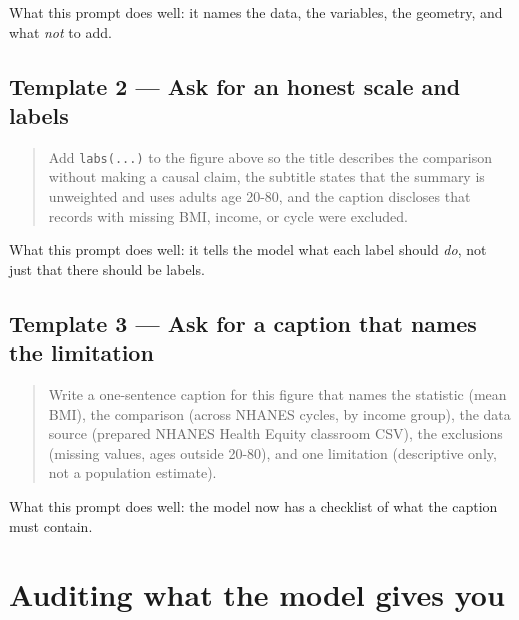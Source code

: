 \documentclass[
  letterpaper,
  DIV=11,
  numbers=noendperiod,
  oneside]{scrreprt}
\begin{document}
What this prompt does well: it names the data, the variables, the
geometry, and what \emph{not} to add.

\subsection*{Template 2 --- Ask for an honest scale and
labels}\label{template-2-ask-for-an-honest-scale-and-labels}

\begin{quote}
Add \texttt{labs(...)} to the figure above so the title describes the
comparison without making a causal claim, the subtitle states that the
summary is unweighted and uses adults age 20-80, and the caption
discloses that records with missing BMI, income, or cycle were excluded.
\end{quote}

What this prompt does well: it tells the model what each label should
\emph{do}, not just that there should be labels.

\subsection*{Template 3 --- Ask for a caption that names the
limitation}\label{template-3-ask-for-a-caption-that-names-the-limitation}

\begin{quote}
Write a one-sentence caption for this figure that names the statistic
(mean BMI), the comparison (across NHANES cycles, by income group), the
data source (prepared NHANES Health Equity classroom CSV), the
exclusions (missing values, ages outside 20-80), and one limitation
(descriptive only, not a population estimate).
\end{quote}

What this prompt does well: the model now has a checklist of what the
caption must contain.

\section*{Auditing what the model gives
you}\label{auditing-what-the-model-gives-you}

\end{document}

